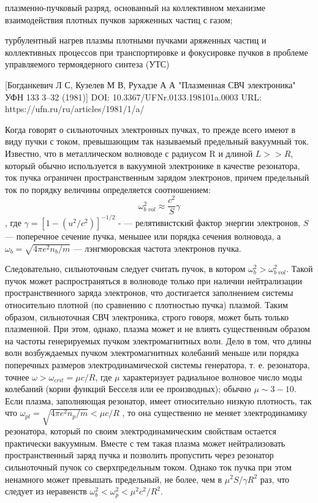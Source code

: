 \documentclass[10pt, a4paper]{article}
\numberwithin{equation}{section}
\begin{document}
плазменно-пучковый разряд, основанный на коллективном механизме взаимодействия плотных пучков заряженных частиц с газом;

турбулентный нагрев плазмы плотными пучками аряженных частиц и коллективных процессов при транспортировке и фокусировке пучков в проблеме управляемого термоядерного синтеза (УТС)

[Богданкевич Л С, Кузелев М В, Рухадзе А А "Плазменная СВЧ электроника" УФН 133 3–32 (1981)]
DOI: 10.3367/UFNr.0133.198101a.0003
URL: https://ufn.ru/ru/articles/1981/1/a/

Когда говорят о сильноточных электронных пучках, то прежде всего имеют в виду пучки с током, превышающим так называемый предельный вакуумный ток. Известно, что в металлическом волноводе с радиусом R и длиной $L >> R$, который обычно используется в вакуумной электронике в качестве резонатора, ток пучка ограничен пространственным зарядом электронов, причем предельный ток по порядку величины определяется соотношением:
\begin{equation}
	\omega_{b \; vol}^{2} \approx \frac{c^{2}}{S} \gamma
\end{equation}
, где $\gamma = [1-(u^{2}/c^{2})]^{-1/2}$ - — релятивистский фактор энергии электронов, $S$ — поперечное сечение пучка, меньшее или порядка сечения волновода, а $\omega_{b}=\sqrt{4\pi e^{2} n_{b} /m}$ — лэнгмюровская частота электронов пучка. 


Следовательно, сильноточным следует считать пучок, в котором $\omega_{b}^{2}>\omega_{b\;vol}^{2}$. Такой пучок может распространяться в волноводе только при наличии нейтрализации пространственного заряда электронов, что достигается заполнением системы относительно плотной (по сравнению с плотностью пучка) плазмой. Таким образом, сильноточная СВЧ электроника, строго говоря, может быть только плазменной. При этом, однако, плазма может и не влиять существенным образом на частоты генерируемых пучком электромагнитных волн. Дело в том, что длины волн возбуждаемых пучком электромагнитных колебаний меньше или порядка поперечных размеров электродинамической системы генератора, т. е. резонатора, точнее $\omega>\omega_{crit}= \mu c/R$, где $\mu$ характеризует радиальное волновое число моды колебаний (корни функций Бесселя или ее производных); обычно $\mu \sim 3-10$. Если плазма, заполняющая резонатор, имеет относительно низкую плотность, так что $\omega_{pl}=\sqrt{4\pi e^{2} n_{p} /m} < \mu c/R$ , то она существенно не меняет электродинамику резонатора, который по своим электродинамическим свойствам остается практически вакуумным. Вместе с тем такая плазма может нейтрализовать пространственный заряд пучка и позволить пропустить через резонатор сильноточный пучок со сверхпредельным током. Однако ток пучка при этом ненамного может превышать предельный, не более, чем в $\mu^{2} S/\gamma R^{2}$ раз, что следует из неравенств $\omega_{b}^{2}<\omega_{p}^{2}<\mu^{2} c^{2}/R^{2}$.
\end{document}
